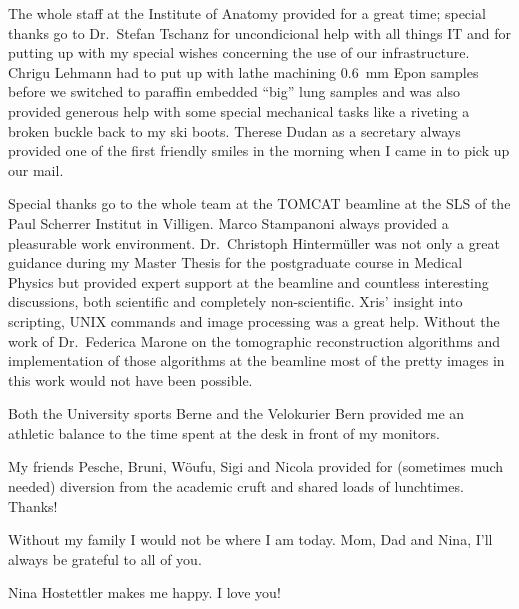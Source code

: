 The whole staff at the Institute of Anatomy provided for a great time; special thanks go to Dr.\ Stefan Tschanz for uncondicional help with all things IT and for putting up with my special wishes concerning the use of our infrastructure. Chrigu Lehmann had to put up with lathe machining \SI{0.6}{\milli\meter} Epon samples before we switched to paraffin embedded ``big'' lung samples and was also provided generous help with some special mechanical tasks like a riveting a broken buckle back to my ski boots. Therese Dudan as a secretary always provided one of the first friendly smiles in the morning when I came in to pick up our mail.

Special thanks go to the whole team at the \acs{TOMCAT} beamline at the \acl{SLS} of the Paul Scherrer Institut in Villigen. Marco Stampanoni always provided a pleasurable work environment. Dr.\ Christoph Hintermüller was not only a great guidance during my Master Thesis for the postgraduate course in Medical Physics but provided expert support at the beamline and countless interesting discussions, both scientific and completely non-scientific. Xris' insight into scripting, UNIX commands and image processing was a great help. Without the work of Dr.\ Federica Marone on the tomographic reconstruction algorithms and implementation of those algorithms at the beamline most of the pretty images in this work would not have been possible.

Both the University sports Berne and the Velokurier Bern provided me an athletic balance to the time spent at the desk in front of my monitors.

My friends Pesche, Bruni, Wöufu, Sigi and Nicola provided for (sometimes much needed) diversion from the academic cruft and shared loads of lunchtimes. Thanks!

Without my family I would not be where I am today. Mom, Dad and Nina, I'll always
be grateful to all of you.

Nina%
Hostettler makes me happy. I love you!
\endgroup